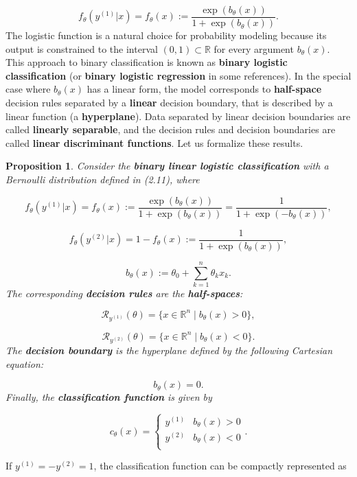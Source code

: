\documentclass{report}
\newtheorem{proposition}{Proposition}[chapter]
\begin{document}
\begin{equation}
f_\theta(y^{(1)}|x) = f_\theta(x) := \frac{\exp (b_\theta(x))}{1+\exp (b_\theta(x))}.
\end{equation}
The logistic function is a natural choice for probability modeling because its output is constrained to the interval $(0, 1) \subset \mathbb{R}$ for every argument $b_\theta(x)$. This approach to binary classification is known as \textbf{binary logistic classification} (or \textbf{binary logistic regression} in some references). In the special case where $b_\theta(x)$ has a linear form, the model corresponds to \textbf{half-space} decision rules separated by a \textbf{linear} decision boundary, that is described by a linear function (a \textbf{hyperplane}). Data separated by linear decision boundaries are called \textbf{linearly separable}, and the decision rules and decision boundaries are called \textbf{linear discriminant functions}. Let us formalize these results.

\begin{proposition}
Consider the \textbf{binary linear logistic classification} with a Bernoulli distribution defined in (2.11), where

\begin{equation}
f_\theta(y^{(1)}|x) = f_\theta(x) := \frac{\exp(b_\theta(x))}{1+\exp(b_\theta(x))} = \frac{1}{1+\exp(-b_\theta(x))},
\end{equation}

\begin{equation}
f_\theta(y^{(2)}|x) = 1- f_\theta(x) := \frac{1}{1+\exp(b_\theta(x))},
\end{equation}

\begin{equation}
b_\theta(x) := \theta_0 + \sum_{k=1}^{n}\theta_kx_k.
\end{equation}
The corresponding \textbf{decision rules} are the \textbf{half-spaces}:

\begin{equation}
\mathcal{R}_{y^{(1)}}(\theta) = \{x \in \mathbb{R}^n \mid b_\theta(x) > 0 \},
\end{equation}

\begin{equation}
\mathcal{R}_{y^{(2)}}(\theta) = \{x \in \mathbb{R}^n \mid b_\theta(x) < 0 \}.
\end{equation}
The \textbf{decision boundary} is the hyperplane defined by the following Cartesian equation:

\begin{equation}
b_\theta(x) = 0.
\end{equation}
Finally, the \textbf{classification function} is given by

\begin{equation}
c_\theta(x) = \left\{\begin{matrix}
y^{(1)} & b_\theta(x) > 0\\
y^{(2)} & b_\theta(x) < 0\\
\end{matrix}\right..
\end{equation}
\end{proposition}
If $y^{(1)} = -y^{(2)} = 1$, the classification function can be compactly represented as
\end{document}
